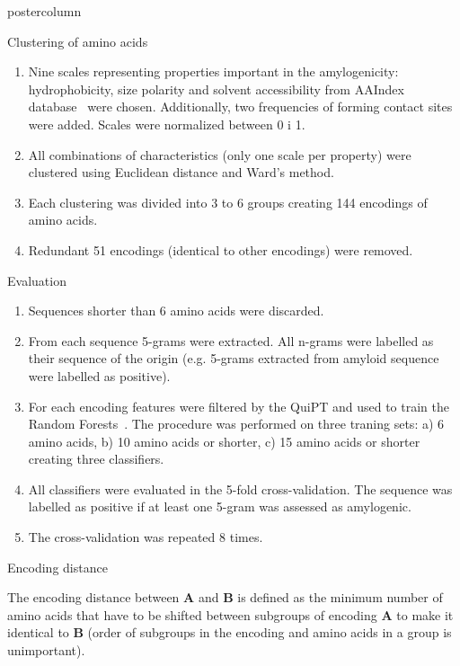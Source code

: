 \documentclass[final]{beamer}\usepackage[]{graphicx}\usepackage[]{color}
\begin{document}
\begin{frame}
\begin{columns}
\begin{column}{.49\textwidth}
\begin{beamercolorbox}[center,wd=\textwidth]{postercolumn}
\begin{minipage}[T]{.95\textwidth}
{\begin{block}{Clustering of amino acids}
\begin{enumerate}[1.]
\item Nine scales representing properties important in the amylogenicity: hydrophobicity, size polarity and solvent accessibility from AAIndex database~\citep{kawashima_aaindex:_2008} were chosen. Additionally, two frequencies of forming contact sites~\citep{wozniak_characteristics_2014} were added. Scales were normalized between 0 i 1.
\item All combinations of characteristics (only one scale per property) were clustered using Euclidean distance and Ward's method.
\item Each clustering was divided into 3 to 6 groups creating 144 encodings of amino acids.
\item Redundant 51 encodings (identical to other encodings) were removed.
\end{enumerate}

\end{block}
\vfill

\begin{block}{Evaluation}

\begin{enumerate}[1.]
\item Sequences shorter than 6 amino acids were discarded.
\item From each sequence 5-grams were extracted. All n-grams were labelled as their sequence of the origin (e.g. 5-grams extracted from amyloid sequence were labelled as positive).
\item For each encoding features were filtered by the QuiPT and used to train the Random Forests~\citep{liaw_classification_2002}. The procedure was performed on three traning sets: a) 6 amino acids, b) 10 amino acids or shorter, c) 15 amino acids or shorter creating three classifiers.
\item All classifiers were evaluated in the 5-fold cross-validation. The sequence was labelled as positive if at least one 5-gram was assessed as amylogenic.
\item The cross-validation was repeated 8 times.
\end{enumerate}

\end{block}
\vfill

\begin{block}{Encoding distance}

The encoding distance between \textbf{A} and \textbf{B} is defined as the minimum number of amino acids that have to be shifted between subgroups of encoding \textbf{A} to make it identical to \textbf{B} (order of subgroups in the encoding and amino acids in a group is unimportant).


\end{block}}
\end{minipage}
\end{beamercolorbox}
\end{column}
\end{columns}
\end{frame}
\end{document}
